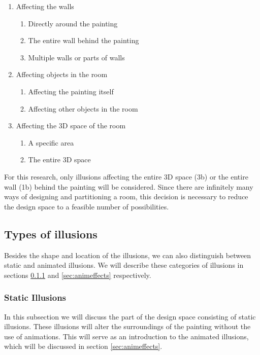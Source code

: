 \documentclass[a4paper]{article}
\begin{document}
\begin{enumerate}
\item Affecting the walls
\begin{enumerate}
\item Directly around the painting
\item The entire wall behind the painting
\item Multiple walls or parts of walls
\end{enumerate}
\item Affecting objects in the room
\begin{enumerate}
\item Affecting the painting itself
\item Affecting other objects in the room
\end{enumerate}
\item Affecting the 3D space of the room
\begin{enumerate}
\item A specific area
\item The entire 3D space
\end{enumerate}
\end{enumerate}

For this research, only illusions affecting the entire 3D space (3b) or the entire wall (1b) behind the painting will be considered. Since there are infinitely many ways of designing and partitioning a room, this decision is necessary to reduce the design space to a feasible number of possibilities. 


\subsection {Types of illusions}
Besides the shape and location of the illusions, we can also distinguish between static and animated illusions. We will describe these categories of illusions in sections \ref{sec:stateffects} and \ref{sec:animeffects} respectively.

\subsubsection{Static Illusions}\label{sec:stateffects}

In this subsection we will discuss the part of the design space consisting of static illusions. These illusions will alter the surroundings of the painting without the use of animations. This will serve as an introduction to the animated illusions, which will be discussed in section \ref{sec:animeffects}.
\end{document}
